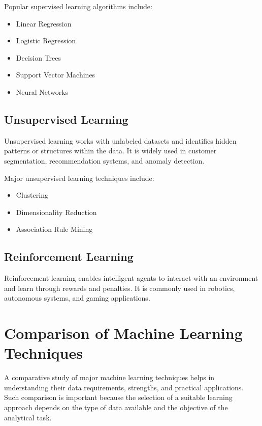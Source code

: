 \documentclass[11pt,a4paper]{article}
\begin{document}
Popular supervised learning algorithms include:
\begin{itemize}
    \item Linear Regression
    \item Logistic Regression
    \item Decision Trees
    \item Support Vector Machines
    \item Neural Networks
\end{itemize}

\subsection{Unsupervised Learning}

Unsupervised learning works with unlabeled datasets and identifies hidden patterns or structures within the data. It is widely used in customer segmentation, recommendation systems, and anomaly detection.

Major unsupervised learning techniques include:
\begin{itemize}
    \item Clustering
    \item Dimensionality Reduction
    \item Association Rule Mining
\end{itemize}

\subsection{Reinforcement Learning}

Reinforcement learning enables intelligent agents to interact with an environment and learn through rewards and penalties. It is commonly used in robotics, autonomous systems, and gaming applications.


\section{Comparison of Machine Learning Techniques}

A comparative study of major machine learning techniques helps in understanding their data requirements, strengths, and practical applications. Such comparison is important because the selection of a suitable learning approach depends on the type of data available and the objective of the analytical task.
\end{document}
